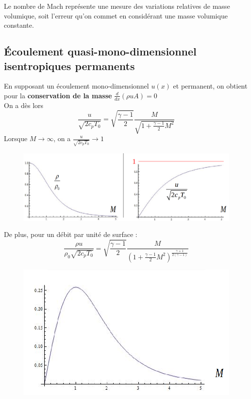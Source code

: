\documentclass[../main.tex]{subfiles}
\begin{document}
\warning Le nombre de Mach représente une mesure des variations relatives de masse volumique, soit l'erreur qu'on commet en considérant une masse volumique constante.\\

\subsection{Écoulement quasi-mono-dimensionnel isentropiques permanents}
En supposant un écoulement mono-dimensionnel $u(x)$ et permanent, on obtient pour la \textbf{conservation de la masse} $\frac{d}{dx}(\rho u A)=0$\\

On a dès lors \begin{equation}
\frac{u}{\sqrt{2 c_p T_0}} = \sqrt{\frac{\gamma-1}{2}} \frac{M}{\sqrt{1+\frac{\gamma-1}{2}M^2}}
\end{equation}
\warning Lorsque $M\rightarrow \infty$, on a $\frac{u}{\sqrt{2 c_pT_0}} \rightarrow 1$\\

\begin{figure}[hbt!]
    \centering
    \includegraphics[width=.6\textwidth]{IMAGES/machineelec/debit_surf.png}
\end{figure}

De plus, pour un débit par unité de surface : \begin{equation}
    \frac{\rho u}{\rho_0 \sqrt{2c_p T_0}} = \sqrt{\frac{\gamma-1}{2}} \frac{M}{(1+\frac{\gamma-1}{2}M^2)^{\frac{\gamma+1}{2(\gamma-1)}}}
\end{equation}

\begin{figure}[hbt!]
    \centering
    \includegraphics[width = .5\textwidth]{IMAGES/machineelec/debit_usurf.png}
\end{figure}
\end{document}
